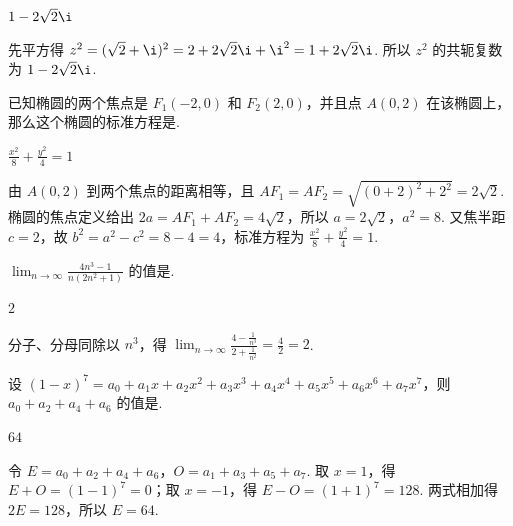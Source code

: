 \begin{answer}\(1-2\sqrt2\i\)\end{answer}

\begin{solution}
先平方得 \(z^{2}=(\sqrt2+\i)^{2}=2+2\sqrt2\i+\i^{2}=1+2\sqrt2\i\). 所以 \(z^{2}\) 的共轭复数为 \(1-2\sqrt2\i\).
\end{solution}

\begin{problem}
已知椭圆的两个焦点是 \(F_{1}(-2,0)\) 和 \(F_{2}(2,0)\)，并且点 \(A(0,2)\) 在该椭圆上，那么这个椭圆的标准方程是\fillinblank{}.
\end{problem}

\begin{answer}\(\displaystyle\frac{x^{2}}8+\frac{y^{2}}4=1\)\end{answer}

\begin{solution}
由 \(A(0,2)\) 到两个焦点的距离相等，且
\(AF_{1}=AF_{2}=\sqrt{(0+2)^{2}+2^{2}}=2\sqrt2\). 椭圆的焦点定义给出 \(2a=AF_{1}+AF_{2}=4\sqrt2\)，所以 \(a=2\sqrt2\)，\(a^{2}=8\). 又焦半距 \(c=2\)，故 \(b^{2}=a^{2}-c^{2}=8-4=4\)，标准方程为 \(\frac{x^{2}}8+\frac{y^{2}}4=1\).
\end{solution}

\begin{problem}
\(\displaystyle\lim_{n\to\infty}\frac{4n^{3}-1}{n(2n^{2}+1)}\) 的值是\fillinblank{}.
\end{problem}

\begin{answer}\(2\)\end{answer}

\begin{solution}
分子、分母同除以 \(n^{3}\)，得
\(\displaystyle\lim_{n\to\infty}\frac{4-\frac1{n^{3}}}{2+\frac1{n^{2}}}=\frac42=2\).
\end{solution}

\begin{problem}
设 \((1-x)^{7}=a_{0}+a_{1}x+a_{2}x^{2}+a_{3}x^{3}+a_{4}x^{4}+a_{5}x^{5}+a_{6}x^{6}+a_{7}x^{7}\)，则 \(a_{0}+a_{2}+a_{4}+a_{6}\) 的值是\fillinblank{}.
\end{problem}

\begin{answer}\(64\)\end{answer}

\begin{solution}
令 \(E=a_{0}+a_{2}+a_{4}+a_{6}\)，\(O=a_{1}+a_{3}+a_{5}+a_{7}\). 取 \(x=1\)，得 \(E+O=(1-1)^{7}=0\)；取 \(x=-1\)，得 \(E-O=(1+1)^{7}=128\). 两式相加得 \(2E=128\)，所以 \(E=64\).
\end{solution}

